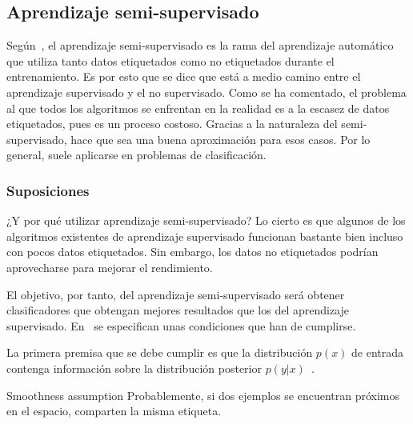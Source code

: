 
\subsection{Aprendizaje semi-supervisado}
\label{aprendizaje-semi-supervisado}

Según~\cite{vanEngelen2020}, el aprendizaje semi-supervisado es la rama del
aprendizaje automático que utiliza tanto datos etiquetados como no etiquetados 
durante el entrenamiento. Es por esto que se dice que está a medio camino entre 
el aprendizaje supervisado y el no supervisado. Como se ha comentado, el problema
al que todos los algoritmos se enfrentan en la realidad es a la escasez de datos 
etiquetados, pues es un proceso costoso. Gracias a la naturaleza del semi-supervisado,
hace que sea una buena aproximación para esos casos. Por lo general, suele aplicarse 
en problemas de clasificación.

\subsubsection{Suposiciones}
\label{suposiciones}
¿Y por qué utilizar aprendizaje semi-supervisado? Lo cierto es que algunos
de los algoritmos existentes de aprendizaje supervisado funcionan bastante bien
incluso con pocos datos etiquetados. Sin embargo, los datos no etiquetados podrían
aprovecharse para mejorar el rendimiento.

El objetivo, por tanto, del aprendizaje semi-supervisado será obtener clasificadores
que obtengan mejores resultados que los del aprendizaje supervisado. En~\cite{vanEngelen2020}
se especifican unas condiciones que han de cumplirse.

La primera premisa que se debe cumplir es que la distribución $p(x)$ de entrada contenga
información sobre la distribución posterior $p(y|x)$~\cite{vanEngelen2020}.

\begin{mainbox}{Smoothness assumption}
    Probablemente, si dos ejemplos se encuentran próximos en el espacio, comparten
    la misma etiqueta.
\end{mainbox}

\medskip


